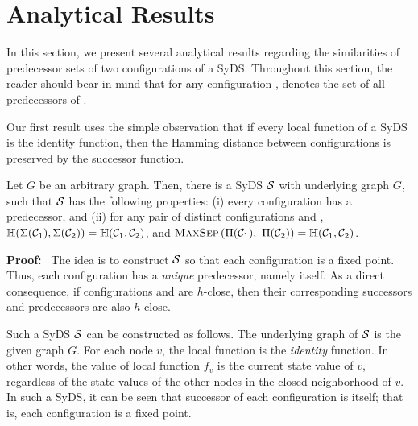 \section{Analytical Results}
\label{sec:analysis}

In this section, we present several analytical results regarding the
similarities of predecessor sets of two configurations of a SyDS.
Throughout this section, the reader should bear in mind that
for any configuration \calc, \predset{\calc}{}
denotes the set of all predecessors of \calc.

Our first result uses the simple observation that if every local function of a SyDS
is the identity function,
then the Hamming distance between  configurations is preserved by the successor function.



\begin{proposition}\label{pro:close-close}
Let $G$ be an arbitrary graph.
Then, there is a SyDS $\mbox{$\mathcal{S}$}${} with underlying graph $G$,
such that $\mbox{$\mathcal{S}$}${} has the following properties: 
(i) every configuration has a predecessor, and (ii) 
for any pair of distinct configurations
\calcone{} and \calctwo{},
$\mbox{$\mathbb{H}$}(\mbox{$\Sigma(\mbox{$\mathcal{C}_{1}$})$}, \mbox{$\Sigma(\mbox{$\mathcal{C}_{2}$}))$} = \mbox{$\mathbb{H}$}(\mbox{$\mathcal{C}_{1}$}, \mbox{$\mathcal{C}_{2}$})$,
and $\mbox{\textsc{MaxSep}}\left( \mbox{$\Pi(\mbox{$\mathcal{C}_{1}$})$},~ \mbox{$\Pi(\mbox{$\mathcal{C}_{2}$})$} \right)
  =  \mbox{$\mathbb{H}$}(\mbox{$\mathcal{C}_{1}$}, \mbox{$\mathcal{C}_{2}$})$.
\end{proposition}

\noindent
\textbf{Proof:}~ The idea is to construct $\mbox{$\mathcal{S}$}${} so that each configuration
is a fixed point.
Thus, each configuration \calc{} has a \emph{unique} predecessor, namely \calc{} itself.
As a direct consequence, if configurations \calcone{} and
\calctwo{} are $h$-close,
then their corresponding successors and predecessors are also $h$-close.

Such a SyDS $\mbox{$\mathcal{S}$}${} can be constructed as follows.
The underlying graph of $\mbox{$\mathcal{S}$}${}  is the given graph $G$.
For each node $v$, the local function is the \emph{identity} function.
In other words, the value of local function $f_v$ is the 
current state value of $v$, regardless of the state values of 
the other nodes in the closed neighborhood of $v$.
In such a SyDS, it can be seen that successor of each configuration \calc{}
is \calc{} itself; that is, each configuration is a fixed point. \QED

